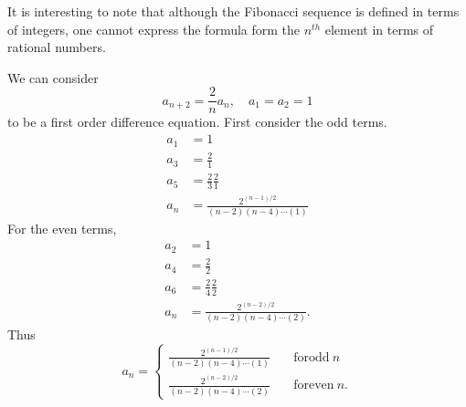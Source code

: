 {\begin{Solution}
  It is interesting to note that although the Fibonacci sequence is defined 
  in terms of integers, one cannot express the formula form the $n^{t h}$  
  element in terms of rational numbers. 
\end{Solution} 






\begin{Solution} 
  \label{solution an2=2nan}
  We can consider  
  \[ a_{n+2} = \frac{2}{n} a_n, \quad a_1 = a_2 = 1 \] 
  to be a first order difference equation. 
  First consider the odd terms. 
  \begin{align*} 
    a_1     &= 1 \\ 
    a_3     &= \frac{2}{1} \\ 
    a_5     &= \frac{2}{3} \frac{2}{1} \\ 
    a_n     &= \frac{2^{(n-1)/2}}{(n-2)(n-4)\cdots(1)} 
  \end{align*} 
  For the even terms, 
  \begin{align*} 
    a_2     &= 1 \\ 
    a_4     &= \frac{2}{2} \\ 
    a_6     &= \frac{2}{4} \frac{2}{2} \\ 
    a_n     &= \frac{2^{(n-2)/2}}{(n-2)(n-4)\cdots(2)}. 
  \end{align*} 
  Thus 
  \[ \boxed{ a_n =  
    \begin{cases} 
      \frac{2^{(n-1)/2}}{(n-2)(n-4)\cdots(1)}  \quad &\mathrm{for odd}\ n \\ 
      \frac{2^{(n-2)/2}}{(n-2)(n-4)\cdots(2)}  \quad &\mathrm{for even}\ n. 
    \end{cases} } 
  \] 
\end{Solution} 








\raggedbottom
}
